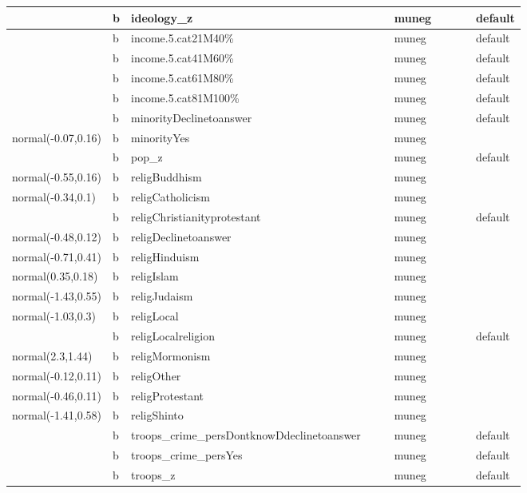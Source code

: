 \documentclass[
]{book}
\theoremstyle{definition}
\theoremstyle{definition}
\theoremstyle{definition}
\theoremstyle{definition}
\theoremstyle{remark}
\begin{document}
\begin{table}
\begin{tabular}[t]{l|l|l|l|l|l|l|l|l|l}
\hline
 & b & ideology\_z &  &  & muneg &  &  &  & default\\
\hline
 & b & income.5.cat21M40\% &  &  & muneg &  &  &  & default\\
\hline
 & b & income.5.cat41M60\% &  &  & muneg &  &  &  & default\\
\hline
 & b & income.5.cat61M80\% &  &  & muneg &  &  &  & default\\
\hline
 & b & income.5.cat81M100\% &  &  & muneg &  &  &  & default\\
\hline
 & b & minorityDeclinetoanswer &  &  & muneg &  &  &  & default\\
\hline
normal(-0.07,0.16) & b & minorityYes &  &  & muneg &  &  &  & \\
\hline
 & b & pop\_z &  &  & muneg &  &  &  & default\\
\hline
normal(-0.55,0.16) & b & religBuddhism &  &  & muneg &  &  &  & \\
\hline
normal(-0.34,0.1) & b & religCatholicism &  &  & muneg &  &  &  & \\
\hline
 & b & religChristianityprotestant &  &  & muneg &  &  &  & default\\
\hline
normal(-0.48,0.12) & b & religDeclinetoanswer &  &  & muneg &  &  &  & \\
\hline
normal(-0.71,0.41) & b & religHinduism &  &  & muneg &  &  &  & \\
\hline
normal(0.35,0.18) & b & religIslam &  &  & muneg &  &  &  & \\
\hline
normal(-1.43,0.55) & b & religJudaism &  &  & muneg &  &  &  & \\
\hline
normal(-1.03,0.3) & b & religLocal &  &  & muneg &  &  &  & \\
\hline
 & b & religLocalreligion &  &  & muneg &  &  &  & default\\
\hline
normal(2.3,1.44) & b & religMormonism &  &  & muneg &  &  &  & \\
\hline
normal(-0.12,0.11) & b & religOther &  &  & muneg &  &  &  & \\
\hline
normal(-0.46,0.11) & b & religProtestant &  &  & muneg &  &  &  & \\
\hline
normal(-1.41,0.58) & b & religShinto &  &  & muneg &  &  &  & \\
\hline
 & b & troops\_crime\_persDontknowDdeclinetoanswer &  &  & muneg &  &  &  & default\\
\hline
 & b & troops\_crime\_persYes &  &  & muneg &  &  &  & default\\
\hline
 & b & troops\_z &  &  & muneg &  &  &  & default\\

\end{tabular}
\end{table}
\end{document}
